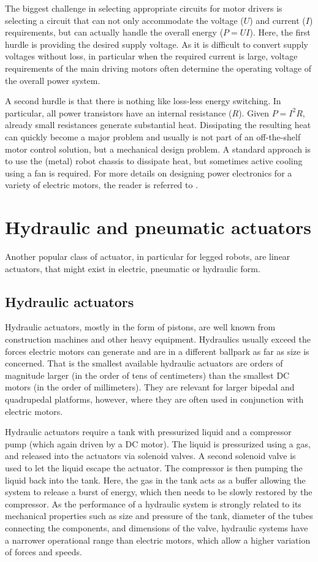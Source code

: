 The biggest challenge in selecting appropriate circuits for motor drivers is selecting a circuit that can not only accommodate the voltage ($U$) and current ($I$) requirements, but can actually handle the overall energy ($P=UI$). Here, the first hurdle is providing the desired supply voltage. As it is difficult to convert supply voltages without loss, in particular when the required current is large, voltage requirements of the main driving motors often determine the operating voltage of the overall power system. 

A second hurdle is that there is nothing like loss-less energy switching. In particular, all power transistors have an internal resistance ($R$). Given $P=I^2R$, already small resistances generate substantial heat. Dissipating the resulting heat can quickly become a major problem and usually is not part of an off-the-shelf motor control solution, but a mechanical design problem. A standard approach is to use the (metal) robot chassis to dissipate heat, but sometimes active cooling using a fan is required. For more details on designing power electronics for a variety of electric motors, the reader is referred to \cite{hughes2019electric}.


\section{Hydraulic and pneumatic actuators}
Another popular class of actuator, in particular for legged robots, are linear actuators, that might exist in electric, pneumatic or hydraulic form. 

\subsection{Hydraulic actuators}
Hydraulic actuators, mostly in the form of pistons, are well known from construction machines and other heavy equipment. Hydraulics usually exceed the forces electric motors can generate and are in a different ballpark as far as size is concerned. That is the smallest available hydraulic actuators are orders of magnitude larger (in the order of tens of centimeters) than the smallest DC motors (in the order of millimeters). They are relevant for larger bipedal and quadrupedal platforms, however, where they are often used in conjunction with electric motors. 

Hydraulic actuators require a tank with pressurized liquid and a compressor pump (which again driven by a DC motor). The liquid is pressurized using a gas, and released into the actuators via solenoid valves. A second solenoid valve is used to let the liquid escape the actuator. The compressor is then pumping the liquid back into the tank. Here, the gas in the tank acts as a buffer allowing the system to release a burst of energy, which then needs to be slowly restored by the compressor. As the performance of a hydraulic system is strongly related to its mechanical properties such as size and pressure of the tank, diameter of the tubes connecting the components, and dimensions of the valve, hydraulic systems have a narrower operational range than electric motors, which allow a higher variation of forces and speeds. 

